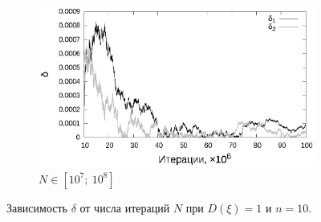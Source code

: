 \documentclass[11pt,a4paper]{article}
\theoremstyle{definition}
\begin{document}
\begin{figure}[h!]
\begin{subfigure}[b]{0.3\textwidth}
    \includegraphics[width=\textwidth]{figs/classic/linear_log_10x_3_samples_10_variance_1_norm.log_end.eps}
    \caption{$N \in [10^7;~10^8]$}
    \label{fig:classic_var1_n10_end}
  \end{subfigure}
  \caption{Зависимость $\delta$ от числа итераций $N$ при $D(\xi) = 1$ и $n = 10$.}
  \label{fig:classic_var1_n10}
\end{figure}
\end{document}
